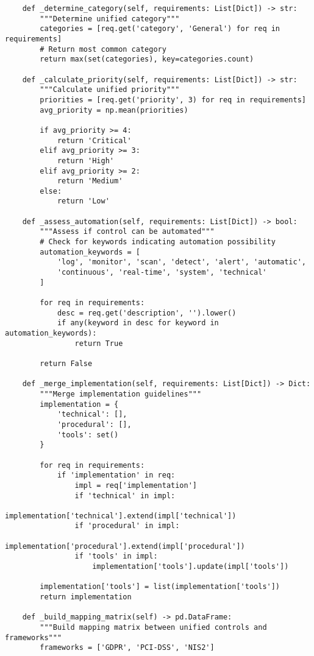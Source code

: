 \begin{verbatim}
    def _determine_category(self, requirements: List[Dict]) -> str:
        """Determine unified category"""
        categories = [req.get('category', 'General') for req in requirements]
        # Return most common category
        return max(set(categories), key=categories.count)
    
    def _calculate_priority(self, requirements: List[Dict]) -> str:
        """Calculate unified priority"""
        priorities = [req.get('priority', 3) for req in requirements]
        avg_priority = np.mean(priorities)
        
        if avg_priority >= 4:
            return 'Critical'
        elif avg_priority >= 3:
            return 'High'
        elif avg_priority >= 2:
            return 'Medium'
        else:
            return 'Low'
    
    def _assess_automation(self, requirements: List[Dict]) -> bool:
        """Assess if control can be automated"""
        # Check for keywords indicating automation possibility
        automation_keywords = [
            'log', 'monitor', 'scan', 'detect', 'alert', 'automatic',
            'continuous', 'real-time', 'system', 'technical'
        ]
        
        for req in requirements:
            desc = req.get('description', '').lower()
            if any(keyword in desc for keyword in automation_keywords):
                return True
        
        return False
    
    def _merge_implementation(self, requirements: List[Dict]) -> Dict:
        """Merge implementation guidelines"""
        implementation = {
            'technical': [],
            'procedural': [],
            'tools': set()
        }
        
        for req in requirements:
            if 'implementation' in req:
                impl = req['implementation']
                if 'technical' in impl:
                    implementation['technical'].extend(impl['technical'])
                if 'procedural' in impl:
                    implementation['procedural'].extend(impl['procedural'])
                if 'tools' in impl:
                    implementation['tools'].update(impl['tools'])
        
        implementation['tools'] = list(implementation['tools'])
        return implementation
    
    def _build_mapping_matrix(self) -> pd.DataFrame:
        """Build mapping matrix between unified controls and frameworks"""
        frameworks = ['GDPR', 'PCI-DSS', 'NIS2']
        

\end{verbatim}

